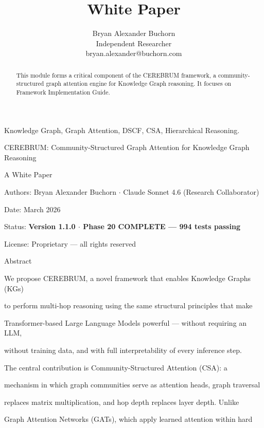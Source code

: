\documentclass[10pt,journal,compsoc]{IEEEtran}
\begin{document}
\title{White Paper}
\author{Bryan Alexander Buchorn \\ Independent Researcher \\ bryan.alexander@buchorn.com}

\maketitle

\begin{abstract}
This module forms a critical component of the CEREBRUM framework, a community-structured graph attention engine for Knowledge Graph reasoning. It focuses on Framework Implementation Guide.
\end{abstract}

\begin{IEEEkeywords}
Knowledge Graph, Graph Attention, DSCF, CSA, Hierarchical Reasoning.
\end{IEEEkeywords}

CEREBRUM: Community-Structured Graph Attention for Knowledge Graph Reasoning

A White Paper

Authors: Bryan Alexander Buchorn $\cdot$ Claude Sonnet 4.6 (Research Collab\-orator)

Date: March 2026

Status: \textbf{Version 1.1.0 $\cdot$ Phase 20 COMPLETE — 994 tests passing}

License: Proprietary — all rights reserved

Abstract

We propose CEREBRUM, a novel framework that enables Knowledge Graphs (KGs)

to perform multi-hop reasoning using the same structural principles that make

Transformer-based Large Language Models powerful — without requiring an LLM,

without training data, and with full inter\-pretability of every inference step.

The central contr\-ibution is Community-Structured Attention (CSA): a

mechanism in which graph communities serve as attention heads, graph traversal

replaces matrix multi\-plication, and hop depth replaces layer depth. Unlike

Graph Attention Networks (GATs), which apply learned attention within hard
\end{document}
